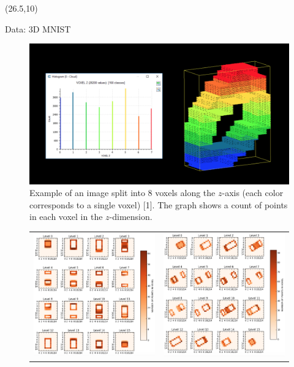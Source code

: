 \documentclass[final]{beamer}
\begin{document}
\begin{frame}{}
\begin{textblock}{30}(26.5,10)
\begin{block}{Data: 3D MNIST}
\begin{figure}
\begin{center}
\includegraphics[width=14cm]{example_voxel.png}
\end{center}
\vspace{0.5em}
\caption{Example of an image split into 8 voxels along the $z$-axis (each color corresponds to a single voxel) [1]. The graph shows a count of points in each voxel in the $z$-dimension.}
\label{example}
\end{figure}
\begin{figure}
\begin{center}
\begin{tabular}{cc}
\includegraphics[width=7cm]{regular.png}&\includegraphics[width=7cm]{augment.png}

\end{tabular}
\end{center}
\end{figure}
\end{block}
\end{textblock}
\end{frame}
\end{document}
